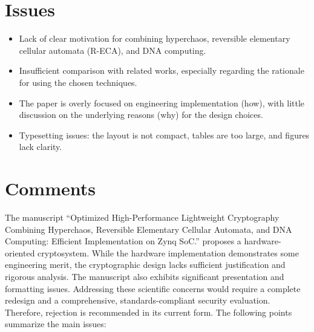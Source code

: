 \documentclass[a4paper]{article}
\begin{document}
\section{Issues}


\begin{itemize}
    \item Lack of clear motivation for combining hyperchaos, reversible elementary cellular automata (R-ECA), and DNA computing.
    \item Insufficient comparison with related works, especially regarding the rationale for using the chosen techniques.
    \item The paper is overly focused on engineering implementation (how), with little discussion on the underlying reasons (why) for the design choices.
    \item Typesetting issues: the layout is not compact, tables are too large, and figures lack clarity.
\end{itemize}

\section{Comments}

 The manuscript “Optimized High-Performance Lightweight Cryptography Combining Hyperchaos, Reversible Elementary Cellular Automata, and DNA Computing: Efficient Implementation on Zynq SoC.” proposes a hardware-oriented cryptosystem. While the hardware implementation demonstrates some engineering merit, the cryptographic design lacks sufficient justification and rigorous analysis. The manuscript also exhibits significant presentation and formatting issues. Addressing these scientific concerns would require a complete redesign and a comprehensive, standards-compliant security evaluation. Therefore, rejection is recommended in its current form. The following points summarize the main issues:
\end{document}
